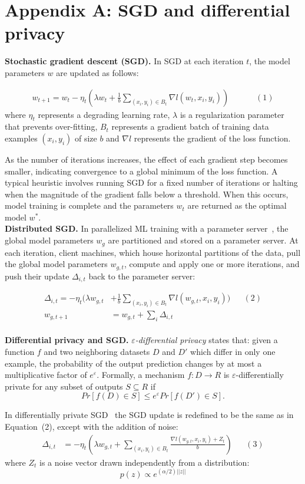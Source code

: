 \section*{Appendix A: SGD and differential privacy}

\noindent \textbf{Stochastic gradient descent (SGD).} In SGD at each iteration
$t$, the model parameters $w$ are updated as follows:

\begin{align*}
  w_{t+1} = w_t - \eta_t(\lambda w_t + \frac{1}{b} \sum_{(x_i, y_i)\in
  B_t} \nabla l(w_t, x_i, y_i)) &&&& (1)
\end{align*}
where $\eta_t$ represents a degrading learning rate, $\lambda$ is a
regularization parameter that prevents over-fitting, $B_t$ represents
a gradient batch of training data examples $(x_i, y_i)$ of size $b$ and
$\nabla l$ represents the gradient of the loss function. 

As the number of iterations increases, the effect of each gradient step
becomes smaller, indicating convergence to a global minimum of the loss
function. A typical heuristic involves running SGD for a fixed number
of iterations or halting when the magnitude of the gradient falls below
a threshold. When this occurs, model training is
complete and the parameters $w_t$ are returned as the optimal
model $w^*$.\\

\noindent \textbf{Distributed SGD.}
In parallelized ML training with a parameter server~\cite{Li:2014},
the global model parameters $w_g$ are partitioned and stored on a
parameter server. At each iteration, client machines, which house
horizontal partitions of the data, pull the global model parameters
$w_{g,t}$, compute and apply one or more iterations, and push their
update $\Delta_{i,t}$ back to the parameter server:

\begin{align*}
  \Delta_{i,t} = - \eta_t(\lambda w_{g,t} &+ \frac{1}{b} \sum_
  {(x_i, y_i)\in B_t} \nabla l(w_{g,t}, x_i, y_i)) && (2) \\
  w_{g,t+1} &= w_{g,t} + \sum_i \Delta_{i,t}
\end{align*}\\


\noindent \textbf{Differential privacy and SGD.}
\textit{$\varepsilon$-differential privacy} states that: given a
function $f$ and two neighboring datasets $D$ and $D'$ which differ in
only one example, the probability of the output prediction changes by
at most a multiplicative factor of $e^\varepsilon$. Formally, a
mechanism $f : D \to R$ is $\varepsilon$-differentially private for
any subset of outputs $S \subseteq R$ if
\[
Pr[f(D) \in S] \leq e^\varepsilon Pr[f(D') \in S].
\]

In differentially private SGD~\cite{Song:2013} the SGD update is
redefined to be the same as in Equation~(2), except with the addition
of noise:
\begin{align*}
  \Delta_{i,t} &= - \eta_t(\lambda w_{g,t} + \sum_{(x_i, y_i)\in B_t}
  \frac{\nabla l(w_{g,t}, x_i, y_i) + Z_t}{b}) && (3)
\end{align*}
where $Z_t$ is a noise vector drawn independently from a distribution:
\[
  p(z) \propto e^{(\alpha/2)||z||}
\]
